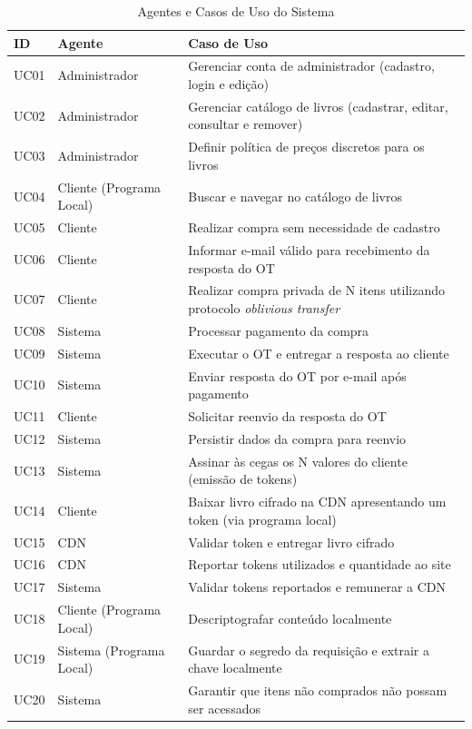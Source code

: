 \begin{table}[htbp]
\centering
\caption{Agentes e Casos de Uso do Sistema}\label{tab:casos-de-uso}
\small
\begin{tabular}{@{}l l p{}@{}}
\toprule
\textbf{ID} & \textbf{Agente} & \textbf{Caso de Uso} \\
\midrule
UC01 & Administrador & Gerenciar conta de administrador (cadastro, login e edição) \\
UC02 & Administrador & Gerenciar catálogo de livros (cadastrar, editar, consultar e remover) \\
UC03 & Administrador & Definir política de preços discretos para os livros \\
UC04 & Cliente (Programa Local) & Buscar e navegar no catálogo de livros \\
UC05 & Cliente & Realizar compra sem necessidade de cadastro \\
UC06 & Cliente & Informar e-mail válido para recebimento da resposta do OT \\
UC07 & Cliente & Realizar compra privada de N itens utilizando protocolo \emph{oblivious transfer} \\
UC08 & Sistema & Processar pagamento da compra \\
UC09 & Sistema & Executar o OT e entregar a resposta ao cliente \\
UC10 & Sistema & Enviar resposta do OT por e-mail após pagamento \\
UC11 & Cliente & Solicitar reenvio da resposta do OT \\
UC12 & Sistema & Persistir dados da compra para reenvio \\
UC13 & Sistema & Assinar às cegas os N valores do cliente (emissão de tokens) \\
UC14 & Cliente & Baixar livro cifrado na CDN apresentando um token (via programa local) \\
UC15 & CDN & Validar token e entregar livro cifrado \\
UC16 & CDN & Reportar tokens utilizados e quantidade ao site \\
UC17 & Sistema & Validar tokens reportados e remunerar a CDN \\
UC18 & Cliente (Programa Local) & Descriptografar conteúdo localmente \\
UC19 & Sistema (Programa Local) & Guardar o segredo da requisição e extrair a chave localmente \\
UC20 & Sistema & Garantir que itens não comprados não possam ser acessados \\
\bottomrule
\end{tabular}
\end{table}

